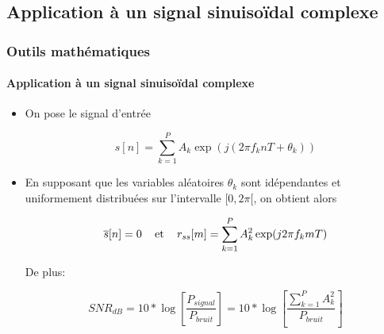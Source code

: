 \documentclass[10pt]{beamer}
\begin{document}
    \subsection{Application à un signal sinuisoïdal complexe} 
    \begin{frame}
    
        \frametitle{Outils mathématiques}
        \framesubtitle{Application à un signal sinuisoïdal complexe}
        
        \begin{itemize}
        
        \item On pose le signal d'entrée
        
        \begin{equation}
        \label{eq:x}
            s[n] = \sum_{k=1}^{P} A_k \exp(j(2\pi f_k n T + \theta _k))
        \end{equation}
        
        \item 
        
        En supposant que les variables aléatoires \(\theta _k\) sont idépendantes et uniformement distribuées sur l'intervalle \( [0, 2\pi[\), on obtient alors
        
        \begin{equation}
        \label{eq:meanx}
            \overline{s}[n] = 0 \text{ \hspace{5pt} et \hspace{5pt} } r_{ss}[m] = \sum_{k=1}^{P} A_k^2 \exp(j 2\pi f_k m T)
        \end{equation}
        
        De plus:
        
        \begin{equation}
        SNR_{dB} = 10* \log \left[ \frac{P_{signal}}{P_{bruit}} \right] = 10* \log \left[ \frac{\sum_{k=1}^{P}A_k^2}{P_{bruit}} \right]
        \end{equation}
        
        \end{itemize}
    \end{frame}
    
    
    
\end{document}
